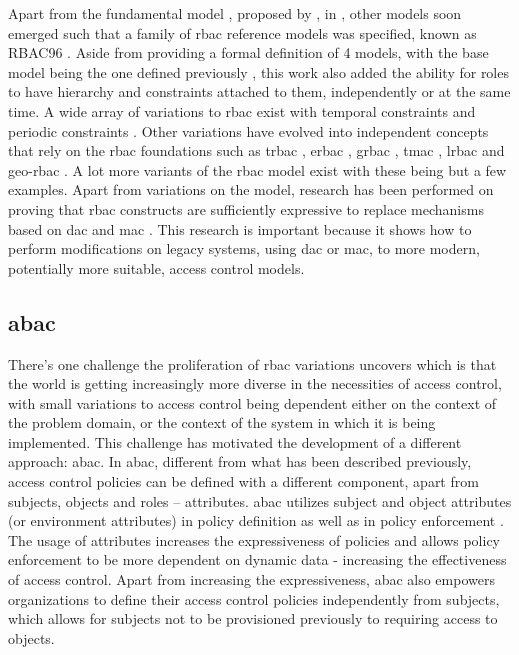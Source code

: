 Apart from the fundamental model \cite{ferraiolo_role-based_1992}, proposed by \citeauthor{ferraiolo_role-based_1992}, in \citeyear{ferraiolo_role-based_1992}, other models soon emerged such that a family of \gls{rbac} reference models was specified, known as RBAC96 \cite{sandhu_role-based_1996}. Aside from providing a formal definition of 4 models, with the base model being the one defined previously \cite{ferraiolo_role-based_1992}, this work also added the ability for roles to have hierarchy and constraints attached to them, independently or at the same time. A wide array of variations to \gls{rbac} exist with temporal constraints \cite{bertino_supporting_1996, bertino_temporal_1996} and periodic constraints \cite{bertino_access_1998}. Other variations have evolved into independent concepts that rely on the \gls{rbac} foundations such as \gls{trbac} \cite{bertino_trbac:_2000}, \gls{erbac} \cite{bonatti_erbac:_2013}, \gls{grbac} \cite{covington_generalized_2000}, \gls{tmac} \cite{thomas_team-based_1997}, \gls{lrbac} \cite{ray_lrbac:_2006} and \gls{geo-rbac} \cite{damiani_georbac:_2007}. A lot more variants of the \gls{rbac} model exist with these being but a few examples. Apart from variations on the model, research has been performed on proving that \gls{rbac} constructs are sufficiently expressive to replace mechanisms based on \gls{dac} and \gls{mac} \cite{jin_unified_2012}. This research is important because it shows how to perform modifications on legacy systems, using \gls{dac} or \gls{mac}, to more modern, potentially more suitable, access control models.

\subsection{\glsdesc{abac}}

There's one challenge the proliferation of \gls{rbac} variations uncovers which is that the world is getting increasingly more diverse in the necessities of access control, with small variations to access control being dependent either on the context of the problem domain, or the context of the system in which it is being implemented. This challenge has motivated the development of a different approach: \glsdesc{abac}. In \gls{abac}, different from what has been described previously, access control policies can be defined with a different component, apart from subjects, objects and roles – attributes. \gls{abac} utilizes subject and object attributes (or environment attributes) in policy definition as well as in policy enforcement \cite{hu_guide_2014}. The usage of attributes increases the expressiveness of policies and allows policy enforcement to be more dependent on dynamic data - increasing the effectiveness of access control. Apart from increasing the expressiveness, \gls{abac} also empowers organizations to define their access control policies independently from subjects, which allows for subjects not to be provisioned previously to requiring access to objects.

